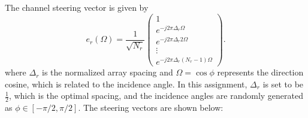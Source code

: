 The channel steering vector is given by
\begin{equation*}
    e_r\left(\Omega\right) = \frac{1}{\sqrt{N_r}} \begin{pmatrix}
    1 \\
    e^{-j 2 \pi \Delta_r \Omega} \\
    e^{-j 2 \pi \Delta_r 2\Omega} \\
    \vdots \\
    e^{-j 2 \pi \Delta_r (N_r - 1)\Omega} 
    \end{pmatrix}.
\end{equation*}
where $\Delta_r$ is the normalized array spacing and $\Omega = \cos \phi$ represents 
the direction cosine, which is related to the incidence angle. In this assignment, 
$\Delta_r$ is set to be $\frac{1}{2}$, which is the optimal spacing, and the incidence 
angles are randomly generated as $\phi \in \left[-\pi/2, \pi/2\right]$. The steering 
vectors are shown below:

